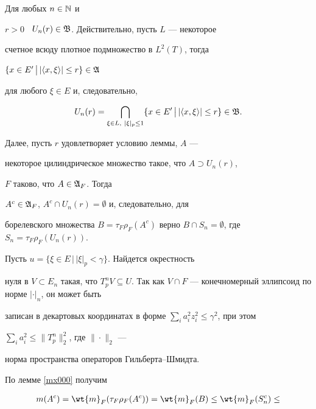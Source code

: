 \begin{pf}


Для любых $n\in\Bbb{N}$ и


$r>0$ \ $U_n(r)\in\frak{B}$. Действительно, пусть $L$ --- некоторое


счетное всюду плотное подмножество в $L^2(T)$, тогда


$\{x\in E'\,\big |\, |\langle x,\xi\rangle |\leq r\}\in \frak{A}$


для любого $\xi\in E$ и, следовательно,


$$


U_n(r)=\bigcap_{\xi\in L,\ |\xi|_p\leq 1}\{x\in E'\,\big |\,


|\la x,\xi\ra |\leq r\}\in\frak{B}.


$$


Далее, пусть $r$ удовлетворяет условию леммы, $A$ ---


некоторое цилиндрическое множество такое, что $A\supset U_n(r)$,


$F$ таково, что $A\in\frak{A}_F$. Тогда


$A^c\in\frak{A}_F$, $A^c\cap U_n(r)=\emptyset$ и, следовательно, для


борелевского множества $B=\tau_F\rho_F(A^c)$ верно $B\cap


S_n=\emptyset$, где $S_n= \tau_F\rho_F(U_n(r))$.





Пусть $u=\{\xi\in E\,\big |\, |\xi|_p<\gamma\}$. Найдется окрестность


нуля в $V\subset E_n$ такая, что $T^n_pV\subseteq U$. Так как $V\cap


F$ --- конечномерный эллипсоид по норме $|\cdot|_n$, он может быть


записан в декартовых координатах в форме $\sum\limits_{i}a_i^2


z_i^2\leq \gamma^2$, при этом


$\sum\limits_{i}a_i^2\leq\|T^n_p\|^2_2$, где $\|\cdot\|_2$ ---


норма пространства операторов Гильберта--Шмидта.





По лемме \ref{mx000} получим


\begin{gather*}


m(A^c)=\wt{m}_F (\tau_F\rho_F(A^c))=


\wt{m}_F(B)\leq \wt{m}_F(S^c_n)\leq



\end{gather*}
\end{pf}
